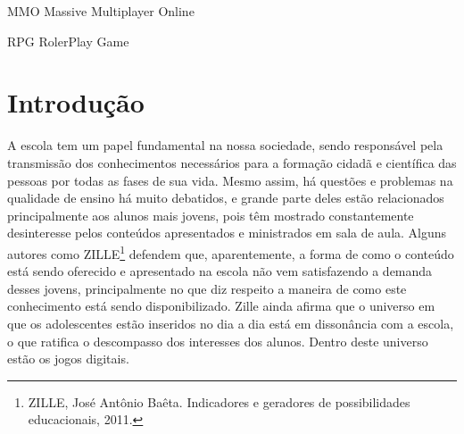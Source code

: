 \documentclass[
	12pt,				%
	openright,			%
	twoside,			%
	a4paper,			%
	english,			%
	french,				%
	spanish,			%
	brazil				%
	]{abntex2}
\begin{document}
\begin{siglas}
  \item[MMO] Massive Multiplayer Online
  \item[RPG] RolerPlay Game
\end{siglas}


\tableofcontents*
\cleardoublepage



\textual

\chapter*[Introdução]{Introdução}
A escola tem um papel fundamental na nossa sociedade, sendo responsável pela transmissão dos conhecimentos necessários para a formação cidadã e científica das pessoas por todas as fases de sua vida. Mesmo assim, há questões e problemas na qualidade de ensino há muito debatidos, e grande parte deles estão relacionados principalmente aos alunos mais jovens, pois têm mostrado constantemente desinteresse pelos conteúdos apresentados e ministrados em sala de aula.
Alguns autores como ZILLE\footnote{ZILLE, José Antônio Baêta. Indicadores e geradores de possibilidades educacionais, 2011.} defendem que, aparentemente, a forma de como o conteúdo está sendo oferecido e apresentado na escola não vem satisfazendo a demanda desses jovens, principalmente no que diz respeito a maneira de como este conhecimento está sendo disponibilizado. Zille ainda afirma que o universo em que os adolescentes estão inseridos no dia a dia está em dissonância com a escola, o que ratifica o descompasso dos interesses dos alunos. Dentro deste universo estão os jogos digitais.
\end{document}
